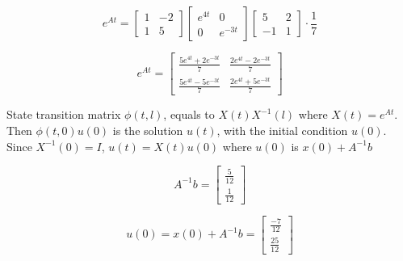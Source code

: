\documentclass[12pt,a4paper, margin=1in]{article}
\newcommand\ddfrac[2]{\frac{\displaystyle #1}{\displaystyle #2}}
\begin{document}
\begin{enumerate}
\begin{enumerate}
            \bigskip \bigskip

            \begin{equation*}
                e^{At} = \begin{bmatrix}
                    1 & -2 \\
                    1 & 5
                \end{bmatrix} \begin{bmatrix}
                    e^{4t} & 0 \\
                    0 & e^{-3t}
                \end{bmatrix} \begin{bmatrix}
                    5 & 2 \\
                    -1 & 1
                \end{bmatrix} \cdot \frac{1}{7}
            \end{equation*}

            \begin{equation*}
                e^{At} = \begin{bmatrix}
                    \ddfrac{5e^{4t} + 2e^{-3t}}{7} & \ddfrac{2e^{4t} - 2e^{-3t}}{7} \\[8pt]
                    \ddfrac{5e^{4t} - 5e^{-3t}}{7} & \ddfrac{2e^{4t} + 5e^{-3t}}{7}
                \end{bmatrix}
            \end{equation*}

            State transition matrix $\phi(t, l)$, equals to $X(t)X^{-1}(l)$ where $X(t) = e^{At}$. Then $\phi(t, 0)u(0)$ is the solution $u(t)$, with the initial condition $u(0)$.
            Since $X^{-1}(0) = I$, $u(t) = X(t)u(0)$ where $u(0)$ is $x(0) + A^{-1}b$

            \begin{equation*}
                A^{-1}b = \begin{bmatrix}
                    \ddfrac{5}{12} \\[8pt]
                    \ddfrac{1}{12}
                \end{bmatrix}
            \end{equation*}

            \begin{equation*}
                u(0) = x(0) + A^{-1}b = \begin{bmatrix}
                    \ddfrac{-7}{12} \\[8pt]
                    \ddfrac{25}{12}
                \end{bmatrix}
            \end{equation*}


\end{enumerate}
\end{enumerate}
\end{document}
